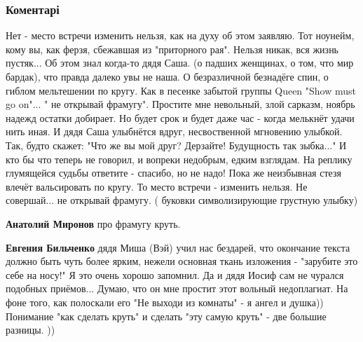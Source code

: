  
 
 
 
 
\subsubsection{Коментарі}

\begin{itemize} %


\begin{multicols}{2}
\obeycr
Нет - место встречи изменить нельзя,
как на духу об этом заявляю.
Тот ноунейм, кому вы, как ферзя,
сбежавшая из "приторного рая".
\smallskip
Нельзя никак, вся жизнь пустяк...
Об этом знал когда-то дядя Саша.
(о падших женщинах, о том, что мир бардак),
что правда далеко увы не наша.
\smallskip
О безразличной безнадёге спин,
о гиблом мельтешении по кругу.
Как в песенке забытой группы Queen
"Show must go on"... " не открывай фрамугу".
\smallskip
Простите мне невольный, злой сарказм,
ноябрь надежд остатки добирает.
Но будет срок и будет даже час -
когда мелькнёт удачи нить иная.
\smallskip
И дядя Саша улыбнётся вдруг,
несвоственной мгновению улыбкой.
Так, будто скажет: "Что же вы мой друг?
Дерзайте! Будущность так зыбка..."
\smallskip
И кто бы что теперь не говорил,
и вопреки недобрым, едким взглядам.
На реплику глумящейся судьбы
ответите - спасибо, но не надо!
\smallskip
Пока же неизбывная стезя
влечёт вальсировать по кругу.
То место встречи - изменить нельзя.
Не совершай... не открывай фрамугу.
\smallskip
( буковки символизирующие грустную улыбку)
\restorecr
\end{multicols}

\begin{itemize} %
\textbf{Анатолий Миронов} про фрамугу круть.

\textbf{Евгения Бильченко} дядя Миша (Вэй) учил нас бездарей, что окончание текста должно быть чуть более ярким, нежели основная ткань изложения - "зарубите это себе на носу!" Я это очень хорошо запомнил. Да и дядя Иосиф сам не чурался подобных приёмов... Думаю, что он мне простит этот вольный недоплагиат. На фоне того, как полоскали его "Не выходи из комнаты" - я ангел и душка))
Понимание "как сделать круть" и сделать "эту самую круть" - две большие разницы. ))



\end{itemize}
\end{itemize}
